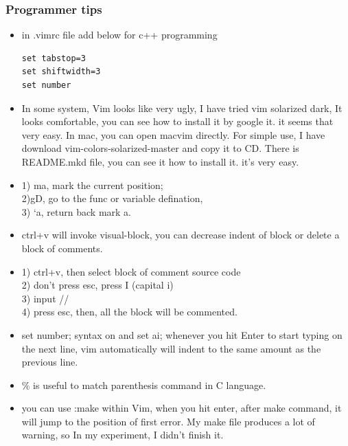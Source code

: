\documentclass[a4paper,12pt,twoside]{book}
\begin{document}
\subsubsection{Programmer tips}
\begin{itemize}
 	\item in .vimrc file add below for c++ programming
	\begin{verbatim}
set tabstop=3
set shiftwidth=3
set number	
	\end{verbatim}
	\item In some system, Vim looks like very ugly, I have tried vim solarized dark, It looks comfortable, you can see how to install it by google it. it seems that very easy.  In mac, you can open macvim directly.  For simple use,  I have download vim-colors-solarized-master and copy it to CD. There is README.mkd file, you can see it how to install it. it's very easy.
	 
	\item  1) ma, mark the current position; \\
	           2)gD, go to the func or variable defination, \\
	           3) `a, return back mark a. \\ 
	 \item ctrl+v will invoke visual-block, you can decrease indent of block or delete a block of comments. 
	 
	 \item 1) ctrl+v, then select block of comment source code \\
	           2) don't press esc, press I (capital i) \\
	           3) input // \\
	           4) press esc, then, all the block will be commented.  
	 \item set number; syntax on and set ai;  whenever you hit Enter to start typing on the next line, vim automatically will indent to the same amount as the previous line.
	 \item \% is useful to match parenthesis command in C language. 
	 \item you can use :make within Vim, when you hit enter, after make command, it will jump to the position of first error. My make file produces a lot of warning, so In my experiment, I didn't finish it.  
	 
\end{itemize}
\end{document}
